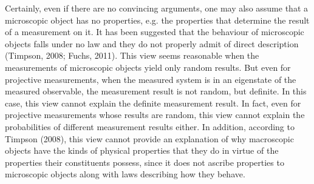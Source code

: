 Certainly, even if there are no convincing arguments, one may also assume that a microscopic object has no  properties, e.g. the properties that determine the result of a measurement on it. It has been suggested that the behaviour of microscopic objects falls under no law and they do not properly admit of direct description (Timpson, 2008; Fuchs, 2011). 
This view seems reasonable when the measurements of microscopic objects yield only random results. But even for projective measurements, when the measured system is in an eigenstate of the measured observable, the measurement result is not random, but definite.
In this case, this view cannot explain the definite measurement result.
In fact, even for projective measurements whose results are random, this view cannot explain the probabilities of different measurement results either.
In addition, according to Timpson (2008), this view cannot provide an explanation of why macroscopic objects have the kinds of physical properties that they do in virtue of the properties their constituents possess, since it does not ascribe properties to microscopic objects along with laws describing how they behave. 


